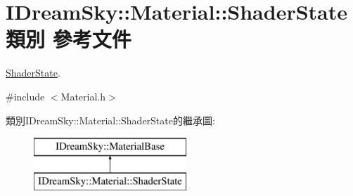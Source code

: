 \hypertarget{class_i_dream_sky_1_1_material_1_1_shader_state}{}\section{I\+Dream\+Sky\+:\+:Material\+:\+:Shader\+State 類別 參考文件}
\label{class_i_dream_sky_1_1_material_1_1_shader_state}


\hyperlink{class_i_dream_sky_1_1_material_1_1_shader_state}{Shader\+State}.  




{\ttfamily \#include $<$Material.\+h$>$}

類別\+I\+Dream\+Sky\+:\+:Material\+:\+:Shader\+State的繼承圖\+:\begin{figure}[H]
\begin{center}
\leavevmode
\includegraphics[height=2.000000cm]{class_i_dream_sky_1_1_material_1_1_shader_state}
\end{center}
\end{figure}
